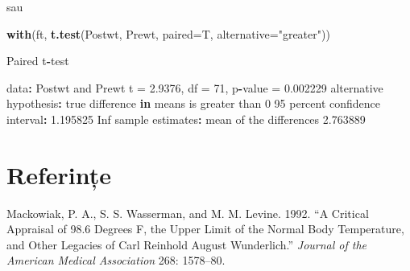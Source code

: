 \documentclass[]{article}
\newenvironment{Shaded}{\begin{snugshade}}{\end{snugshade}}
\newcommand{\KeywordTok}[1]{\textcolor[rgb]{0.13,0.29,0.53}{\textbf{#1}}}
\newcommand{\DataTypeTok}[1]{\textcolor[rgb]{0.13,0.29,0.53}{#1}}
\newcommand{\DecValTok}[1]{\textcolor[rgb]{0.00,0.00,0.81}{#1}}
\newcommand{\FloatTok}[1]{\textcolor[rgb]{0.00,0.00,0.81}{#1}}
\newcommand{\StringTok}[1]{\textcolor[rgb]{0.31,0.60,0.02}{#1}}
\newcommand{\OtherTok}[1]{\textcolor[rgb]{0.56,0.35,0.01}{#1}}
\newcommand{\ControlFlowTok}[1]{\textcolor[rgb]{0.13,0.29,0.53}{\textbf{#1}}}
\newcommand{\OperatorTok}[1]{\textcolor[rgb]{0.81,0.36,0.00}{\textbf{#1}}}
\newcommand{\NormalTok}[1]{#1}
\begin{document}
sau

\begin{Shaded}
\begin{Highlighting}[]
\KeywordTok{with}\NormalTok{(ft, }\KeywordTok{t.test}\NormalTok{(Postwt, Prewt, }\DataTypeTok{paired=}\NormalTok{T, }\DataTypeTok{alternative=}\StringTok{"greater"}\NormalTok{))}

\NormalTok{    Paired t}\OperatorTok{-}\NormalTok{test}

\NormalTok{data}\OperatorTok{:}\StringTok{  }\NormalTok{Postwt and Prewt}
\NormalTok{t =}\StringTok{ }\FloatTok{2.9376}\NormalTok{, df =}\StringTok{ }\DecValTok{71}\NormalTok{, p}\OperatorTok{-}\NormalTok{value =}\StringTok{ }\FloatTok{0.002229}
\NormalTok{alternative hypothesis}\OperatorTok{:}\StringTok{ }\NormalTok{true difference }\ControlFlowTok{in}\NormalTok{ means is greater than }\DecValTok{0}
\DecValTok{95}\NormalTok{ percent confidence interval}\OperatorTok{:}
\StringTok{ }\FloatTok{1.195825}      \OtherTok{Inf}
\NormalTok{sample estimates}\OperatorTok{:}
\NormalTok{mean of the differences }
               \FloatTok{2.763889} 
\end{Highlighting}
\end{Shaded}

\section*{Referințe}\label{referinte}

\hypertarget{refs}{}
\hypertarget{ref-Mackowiak1992}{}
Mackowiak, P. A., S. S. Wasserman, and M. M. Levine. 1992. ``A Critical
Appraisal of 98.6 Degrees F, the Upper Limit of the Normal Body
Temperature, and Other Legacies of Carl Reinhold August Wunderlich.''
\emph{Journal of the American Medical Association} 268: 1578--80.
\end{document}
